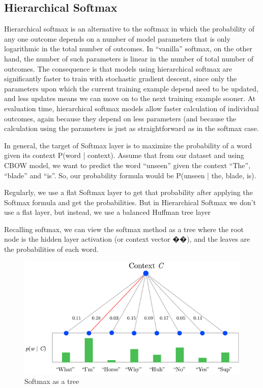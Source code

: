 \subsection{Hierarchical Softmax}

Hierarchical softmax is an alternative to the softmax in which the probability of any one outcome depends on a number of model parameters that is only logarithmic in the total number of outcomes. In “vanilla” softmax, on the other hand, the number of such parameters is linear in the number of total number of outcomes.
The consequence is that models using hierarchical softmax are significantly faster to train with stochastic gradient descent, since only the parameters upon which the current training example depend need to be updated, and less updates means we can move on to the next training example sooner. At evaluation time, hierarchical softmax models allow faster calculation of individual outcomes, again because they depend on less parameters (and because the calculation using the parameters is just as straightforward as in the softmax case.

\vspace{1 cm}

In general, the target of Softmax layer is to maximize the probability of a word given its context P(word | context). Assume that from our dataset and using CBOW model, we want to predict the word “unseen” given the context “The”, “blade” and “is”. So, our probability formula would be P(unseen | the, blade, is).

Regularly, we use a flat Softmax layer to get that probability after applying the Softmax formula and get the probabilities. But in Hierarchical Softmax we don’t use a flat layer, but instead, we use a balanced Huffman tree layer \\

\vspace{1 cm}

Recalling softmax, we can view the softmax method as a tree where the root node is the hidden layer activation (or context vector ��), and the leaves are the probabilities of each word.

\begin{figure}[ht]
    \centering
    \includegraphics[scale=0.7]{Images/hsmx.png}
    \caption{Softmax as a tree}
    \label{fig:smxtree}
\end{figure}

